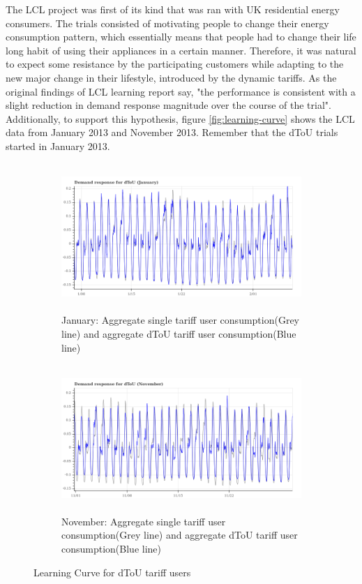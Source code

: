 The LCL project was first of its kind that was ran with UK residential energy consumers. The trials consisted of motivating people to change their energy consumption pattern, which essentially means that people had to change their life long habit of using their appliances in a certain manner. Therefore, it was natural to expect some resistance by the participating customers while adapting to the new major change in their lifestyle, introduced by the dynamic tariffs. As the original findings of LCL learning report say, "the performance is consistent with a slight reduction in demand response magnitude over the course of the trial". Additionally, to support this hypothesis, figure \ref{fig:learning-curve} shows the LCL data from January 2013 and November 2013. Remember that the dToU trials started in January 2013.


\begin{figure}[t!]
    \label{fig:learning-curve}
    \centering
    \begin{subfigure}{0.8\textwidth}
        \centering
        \includegraphics[height=2.2in]{img/DR-dToU-January.png}
        \caption{January: Aggregate single tariff user consumption(Grey line) and aggregate dToU tariff user consumption(Blue line)}
    \end{subfigure}%
     
    \begin{subfigure}{0.8\textwidth}
        \centering
        \includegraphics[height=2.2in]{img/DR-dToU-November.png}
        \caption{November: Aggregate single tariff user consumption(Grey line) and aggregate dToU tariff user consumption(Blue line)}
    \end{subfigure}
    \caption{Learning Curve for dToU tariff users}
\end{figure}


